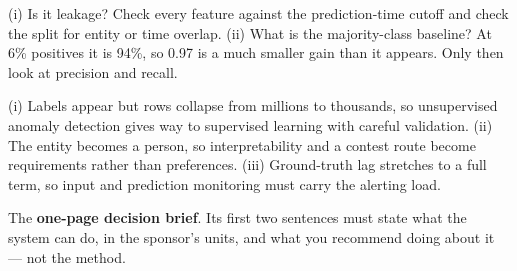 \begin{ans}
  \item (i) Is it leakage? Check every feature against the prediction-time cutoff and
        check the split for entity or time overlap. (ii) What is the majority-class
        baseline? At 6\% positives it is 94\%, so 0.97 is a much smaller gain than it
        appears. Only then look at precision and recall.
  \item (i) Labels appear but rows collapse from millions to thousands, so
        unsupervised anomaly detection gives way to supervised learning with careful
        validation. (ii) The entity becomes a person, so interpretability and a
        contest route become requirements rather than preferences. (iii) Ground-truth
        lag stretches to a full term, so input and prediction monitoring must carry
        the alerting load.
  \item The \textbf{one-page decision brief}. Its first two sentences must state what
        the system can do, in the sponsor's units, and what you recommend doing about
        it --- not the method.
\end{ans}
